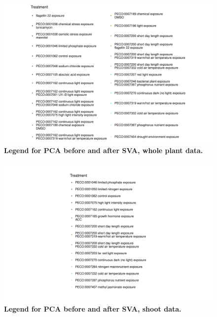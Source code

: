 \documentclass[12pt]{article}
\begin{document}
\begin{figure}[H]
\centering
\includegraphics[width = \linewidth]{figures/appendix_a/pca_beforeAndAfterSva_plant_legend_2023-02-21.pdf}
\caption{\textbf{Legend for PCA before and after SVA, whole plant data.}}%
\label{fig::pcaLegendPlant}
\end{figure}

\begin{figure}[H]
\centering
\includegraphics[width = \linewidth]{figures/appendix_a/pca_beforeAndAfterSva_shoot_legend_2023-02-21.pdf}
\caption{\textbf{Legend for PCA before and after SVA, shoot data.}}%
\label{fig::pcaLegendShoot}
\end{figure}
\end{document}
